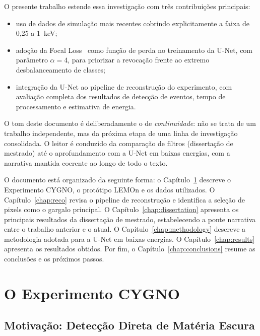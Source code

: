 \documentclass[
       oneside,
       english,
       brazil
       ]{abntbibufjf}
\begin{document}
O presente trabalho estende essa investigação com três contribuições
principais:
\begin{itemize}
    \item uso de dados de simulação mais recentes cobrindo explicitamente a
    faixa de 0,25 a 1~keV;
    \item adoção da Focal Loss~\cite{lin2017focal} como função de perda no
    treinamento da U-Net, com parâmetro $\alpha = 4$, para priorizar a
    revocação frente ao extremo desbalanceamento de classes;
    \item integração da U-Net ao pipeline de reconstrução do experimento, com
    avaliação completa dos resultados de detecção de eventos, tempo de
    processamento e estimativa de energia.
\end{itemize}

O tom deste documento é deliberadamente o de \emph{continuidade}: não se
trata de um trabalho independente, mas da próxima etapa de uma linha de
investigação consolidada. O leitor é conduzido da comparação de filtros
(dissertação de mestrado) até o aprofundamento com a U-Net em baixas
energias, com a narrativa mantida coerente ao longo de todo o texto.

O documento está organizado da seguinte forma: o
Capítulo~\ref{chap:cygno} descreve o Experimento CYGNO, o protótipo LEMOn e
os dados utilizados. O Capítulo~\ref{chap:reco} revisa o pipeline de
reconstrução e identifica a seleção de pixels como o gargalo principal. O
Capítulo~\ref{chap:dissertation} apresenta os principais resultados da
dissertação de mestrado, estabelecendo a ponte narrativa entre o trabalho
anterior e o atual. O Capítulo~\ref{chap:methodology} descreve a metodologia
adotada para a U-Net em baixas energias. O
Capítulo~\ref{chap:results} apresenta os resultados obtidos. Por fim, o
Capítulo~\ref{chap:conclusions} resume as conclusões e os próximos passos.


\chapter{O Experimento CYGNO}
\label{chap:cygno}

\section{Motivação: Detecção Direta de Matéria Escura}
\label{sec:dm}
\end{document}
